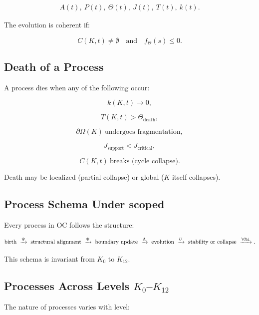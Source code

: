 \begin{align*}
A(t),\ 
P(t),\ 
\Theta(t),\ 
J(t),\ 
T(t),\ 
k(t).
\end{align*}

The evolution is coherent if:

\[
C(K,t) \neq \emptyset 
\quad\text{and}\quad
f_{\Theta}(s) \le 0.
\]

\subsection{Death of a Process}

A process dies when any of the following occur:

\[
k(K,t) \to 0,
\]

\[
T(K,t) > \Theta_{\mathrm{death}},
\]

\[
\partial\Omega(K) \ \text{undergoes fragmentation},
\]

\[
J_{\mathrm{support}} < J_{\mathrm{critical}},
\]

\[
C(K,t) \ \text{breaks (cycle collapse)}.
\]

Death may be localized (partial collapse) or global ($K$ itself collapses).

\subsection{Process Schema Under scoped}

Every process in OC follows the structure:

\[
\text{birth} 
\ \xrightarrow{\Psi}
\ \text{structural alignment}
\ \xrightarrow{\Phi}
\ \text{boundary update}
\ \xrightarrow{\Lambda}
\ \text{evolution}
\ \xrightarrow{U}
\ \text{stability or collapse}
\ \xrightarrow{\Chi}.
\]

This schema is invariant from $K_0$ to $K_{12}$.

\subsection{Processes Across Levels \texorpdfstring{$K_0$}{K_0}--$K_{12}$}

The nature of processes varies with level:

